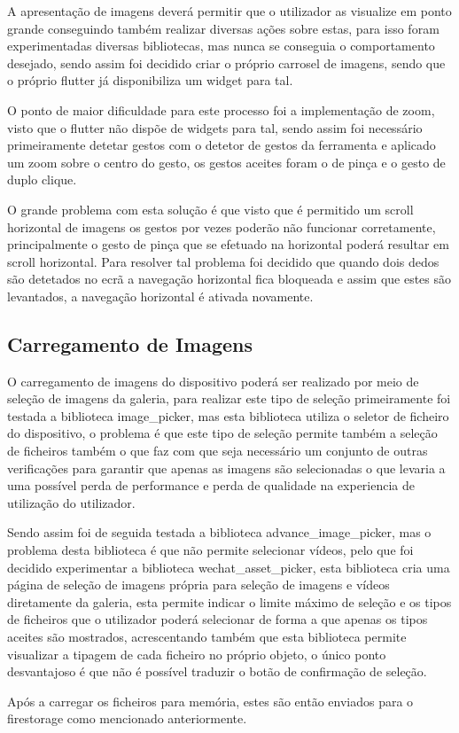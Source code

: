 A apresentação de imagens deverá permitir que o utilizador as visualize em ponto grande conseguindo também realizar diversas ações sobre estas, para isso foram experimentadas diversas bibliotecas, mas nunca se conseguia o comportamento desejado, sendo assim foi decidido criar o próprio carrosel de imagens, sendo que o próprio flutter já disponibiliza um widget para tal.

O ponto de maior dificuldade para este processo foi a implementação de zoom, visto que o flutter não dispõe de widgets para tal, sendo assim foi necessário primeiramente detetar gestos com o detetor de gestos da ferramenta e aplicado um zoom sobre o centro do gesto, os gestos aceites foram o de pinça e o gesto de duplo clique.

O grande problema com esta solução é que visto que é permitido um scroll horizontal de imagens os gestos por vezes poderão não funcionar corretamente, principalmente o gesto de pinça que se efetuado na horizontal poderá resultar em scroll horizontal. Para resolver tal problema foi decidido que quando dois dedos são detetados no ecrã a navegação horizontal fica bloqueada e assim que estes são levantados, a navegação horizontal é ativada novamente.

\subsection{Carregamento de Imagens}

O carregamento de imagens do dispositivo poderá ser realizado por meio de seleção de imagens da galeria, para realizar este tipo de seleção primeiramente foi testada a biblioteca image\_picker, mas esta biblioteca utiliza o seletor de ficheiro do dispositivo, o problema é que este tipo de seleção permite também a seleção de ficheiros também o que faz com que seja necessário um conjunto de outras verificações para garantir que apenas as imagens são selecionadas o que levaria a uma possível perda de performance e perda de qualidade na experiencia de utilização do utilizador.

Sendo assim foi de seguida testada a biblioteca advance\_image\_picker, mas o problema desta biblioteca é que não permite selecionar vídeos, pelo que foi decidido experimentar a biblioteca wechat\_asset\_picker, esta biblioteca cria uma página de seleção de imagens própria para seleção de imagens e vídeos diretamente da galeria, esta permite indicar o limite máximo de seleção e os tipos de ficheiros que o utilizador poderá selecionar de forma a que apenas os tipos aceites são mostrados, acrescentando também que esta biblioteca permite visualizar a tipagem de cada ficheiro no próprio objeto, o único ponto desvantajoso é que não é possível traduzir o botão de confirmação de seleção.

Após a carregar os ficheiros para memória, estes são então enviados para o firestorage como mencionado anteriormente.